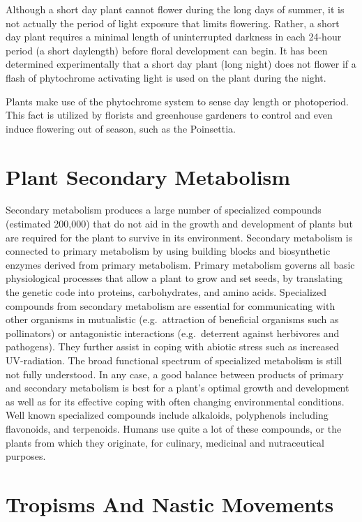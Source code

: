 Although a short day plant cannot flower during the long days of summer, it is not actually the period of light exposure that limits flowering. Rather, a short day plant requires a minimal length of uninterrupted darkness in each 24-hour period (a short daylength) before floral development can begin. It has been determined experimentally that a short day plant (long night) does not flower if a flash of phytochrome activating light is used on the plant during the night.

Plants make use of the phytochrome system to sense day length or photoperiod. This fact is utilized by florists and greenhouse gardeners to control and even induce flowering out of season, such as the Poinsettia.

\hypertarget{plant-secondary-metabolism}{%
\section{Plant Secondary Metabolism}\label{plant-secondary-metabolism}}

Secondary metabolism produces a large number of specialized compounds (estimated 200,000) that do not aid in the growth and development of plants but are required for the plant to survive in its environment. Secondary metabolism is connected to primary metabolism by using building blocks and biosynthetic enzymes derived from primary metabolism. Primary metabolism governs all basic physiological processes that allow a plant to grow and set seeds, by translating the genetic code into proteins, carbohydrates, and amino acids. Specialized compounds from secondary metabolism are essential for communicating with other organisms in mutualistic (e.g.~attraction of beneficial organisms such as pollinators) or antagonistic interactions (e.g.~deterrent against herbivores and pathogens). They further assist in coping with abiotic stress such as increased UV-radiation. The broad functional spectrum of specialized metabolism is still not fully understood. In any case, a good balance between products of primary and secondary metabolism is best for a plant's optimal growth and development as well as for its effective coping with often changing environmental conditions. Well known specialized compounds include alkaloids, polyphenols including flavonoids, and terpenoids. Humans use quite a lot of these compounds, or the plants from which they originate, for culinary, medicinal and nutraceutical purposes.

\hypertarget{tropisms-and-nastic-movements}{%
\section{Tropisms And Nastic Movements}\label{tropisms-and-nastic-movements}}

